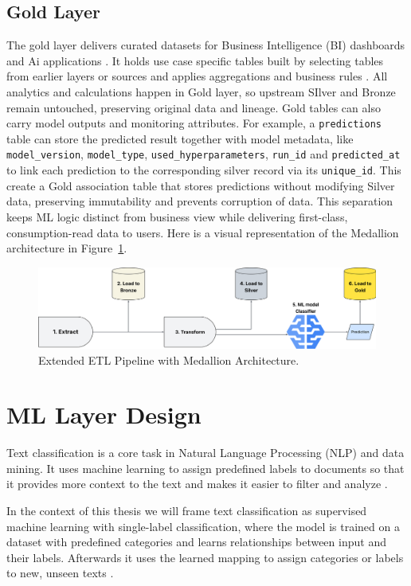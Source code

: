 \subsection{Gold Layer}
The gold layer delivers curated datasets for Business Intelligence (BI) dashboards and Ai applications \cite{garagnani:2013}. It holds use case specific tables built by selecting tables from earlier layers or sources and applies aggregations and business rules \cite{wiselka:2024}. All analytics and calculations happen in Gold layer, so upstream SIlver and Bronze remain untouched, preserving original data and lineage. Gold tables can also carry model outputs and monitoring attributes. For example, a \texttt{predictions} table can store the predicted result together with model metadata, like \texttt{model\_version}, \texttt{model\_type}, \texttt{used\_hyperparameters}, \texttt{run\_id} and \texttt{predicted\_at} to link each prediction to the corresponding silver record via its \texttt{unique\_id}. This create a Gold association table that stores predictions without modifying Silver data, preserving immutability and prevents corruption of data. This separation keeps ML logic distinct from business view while delivering first-class, consumption-read data to users.
Here is a visual representation of the Medallion architecture in Figure~\ref{fig:medallion}.

\begin{figure}[htbp]
  \centering
  \includegraphics[width=\linewidth]{gfx/examples/medallion.jpeg}
  \caption{Extended ETL Pipeline with Medallion Architecture.}
  \label{fig:medallion}
\end{figure}

\section{ML Layer Design }
Text classification is a core task in Natural Language Processing (NLP) and data mining. It uses machine learning to assign predefined labels to documents so that it provides more context to the text and makes it easier to filter and analyze \cite{allam:2024}.
\smallskip

In the context of this thesis we will frame text classification as supervised machine learning with single-label classification, where the model is trained on a dataset with predefined categories and learns relationships between input and their labels. Afterwards it uses the learned mapping to assign categories or labels to new, unseen texts \cite{wang:2023}.
\smallskip


